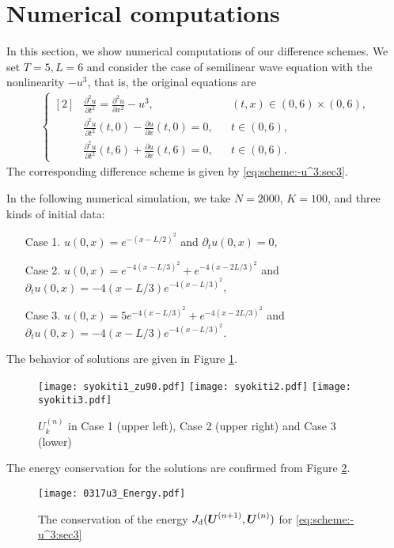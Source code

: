 \documentclass[dvipdfmx-if-dvi,autodetect-engine,ja=standard]{amsart}
\numberwithin{equation}{section} %
\def\vect#1{\mbox{\boldmath $#1$}} %
\begin{document}
\section{Numerical computations}
In this section, we show
numerical computations of
our difference schemes.
We set
$T=5, L=6$
and consider the case of semilinear wave equation with
the nonlinearity
$-u^3$,
that is, the original equations are
\begin{align}\label{eq:ndw:-u^3}
    \left\{ \begin{aligned}[2]
    &\frac{\partial^2 u}{\partial t^2} = \frac{\partial^2 u}{\partial x^2} - u^3,
    &&(t,x) \in (0,6)\times (0,6),\\
    &\frac{\partial^2 u}{\partial t^2}(t,0)
    - \frac{\partial u}{\partial x}(t,0) = 0,
    &&t\in (0,6),\\
    &\frac{\partial^2 u}{\partial t^2}(t,6)
    +\frac{\partial u}{\partial x}(t,6) = 0,
    &&t\in (0,6).
    \end{aligned}\right.
\end{align}
The corresponding difference scheme is given by
\eqref{eq:scheme:-u^3:sec3}.

In the following numerical simulation,
we take
$N=2000$, $K = 100$,
and three kinds of initial data:
\begin{itemize}
    \item[Case 1.]
    $u(0,x) = e^{-(x-L/2)^2}$
    and
    $\partial_t u(0,x) = 0$, 
    \item[Case 2.]
    $u(0,x) = e^{-4(x-L/3)^2} + e^{-4(x-2L/3)^2}$
    and
    $\partial_t u (0,x) = -4(x-L/3) e^{-4(x-L/3)^2}$, 
    \item[Case 3.]
    $u(0,x) = 5 e^{-4(x-L/3)^2} + e^{-4(x-2L/3)^2}$
    and
    $\partial_t u (0,x) = -4(x-L/3) e^{-4(x-L/3)^2}$. 
\end{itemize}
The behavior of solutions are given in Figure \ref{fig:1}. 
\begin{figure}[H]
\begin{center}
{\texttt{[image: syokiti1\_zu90.pdf]} 
\texttt{[image: syokiti2.pdf]}
\texttt{[image: syokiti3.pdf]}}
\caption{$U_k^{(n)}$ in Case 1 (upper left), Case 2 (upper right) and Case 3 (lower)}
    \label{fig:1} 
\end{center}
\end{figure}

The energy conservation for the solutions are confirmed from Figure \ref{fig:2}.  
\begin{figure}[H]
\begin{center}
\texttt{[image: 0317u3\_Energy.pdf]} 
\caption{The conservation of the energy $J_{\mathrm{d}}(\vect{U}^{(n+1)}, \vect{U}^{(n)})$ for \eqref{eq:scheme:-u^3:sec3}}
    \label{fig:2} 
\end{center}
\end{figure}
\end{document}
